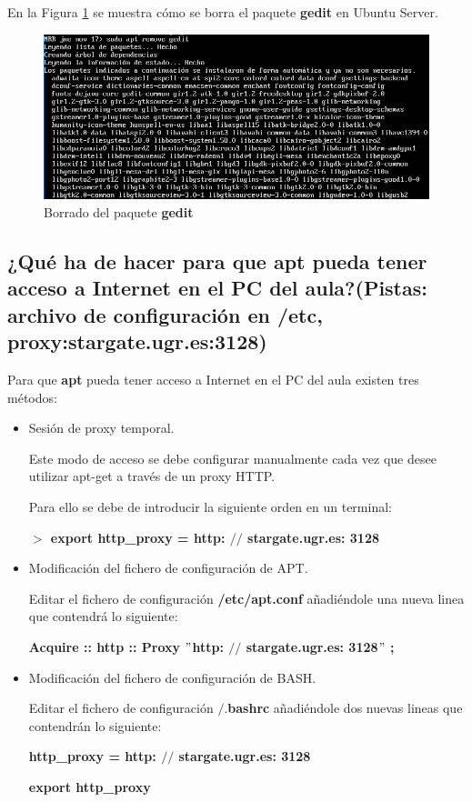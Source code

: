 \begin{itemize}
	En la Figura \ref{fig:figura7} se muestra cómo se borra el paquete \textbf{gedit} en Ubuntu Server.
	\begin{figure}[H] %
		\centering
		\includegraphics[scale=0.6]{figuras/figura7.png} 
		\caption{Borrado del paquete \textbf{gedit}} 
		\label{fig:figura7}
	\end{figure}			
\end{itemize}

\subsection{¿Qué ha de hacer para que apt pueda tener acceso a
	Internet en el PC del aula?(Pistas: archivo de configuración en /etc, proxy:stargate.ugr.es:3128)}

Para que \textbf{apt} pueda tener acceso a Internet en el PC del aula existen tres métodos\cite{enlace8}:

\begin{itemize}
	\item Sesión de proxy temporal.
	
	Este modo de acceso se debe configurar manualmente cada vez que desee utilizar apt-get a través de un proxy HTTP. 
	
	Para ello se debe de introducir la siguiente orden en un terminal:	
	\begin{center}
		\textbf{$ > $ export http\_proxy  =  http:  $ // $  stargate.ugr.es: 3128 }
	\end{center}

	\item Modificación del fichero de configuración de APT.
	
	Editar el fichero de configuración \textbf{/etc/apt.conf}\cite{enlace7} añadiéndole una nueva linea que contendrá lo siguiente: 
	
	\begin{center}
		\textbf{Acquire :: http :: Proxy $ " $http: $ // $ stargate.ugr.es: 3128$ " $ ;}
	\end{center}

	\item Modificación del fichero de configuración de BASH\cite{enlace9}.
	
	Editar el fichero de configuración  \textbf{ \AC $ /. $bashrc} añadiéndole dos nuevas lineas que contendrán lo siguiente: 
	
	
	\textbf{http\_proxy = http: $ // $ stargate.ugr.es: 3128}
	
	\textbf{export http\_proxy}
	
	
\end{itemize}

